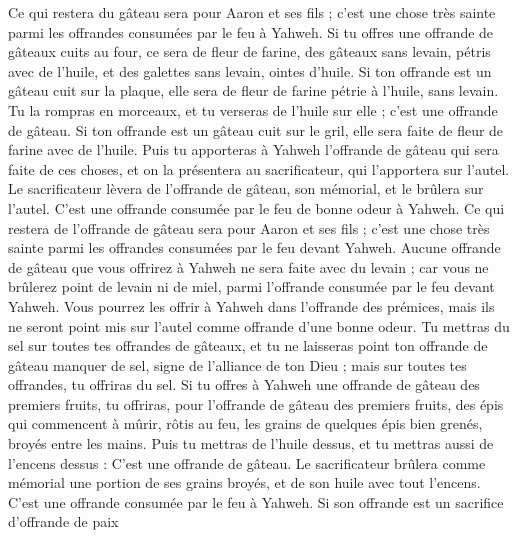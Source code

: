 \begin{multicols}{2}
Ce qui restera du gâteau sera pour Aaron et ses fils ; c'est une chose très sainte parmi les offrandes consumées par le feu à Yahweh.
Si tu offres une offrande de gâteaux cuits au four, ce sera de fleur de farine, des gâteaux sans levain, pétris avec de l'huile, et des galettes sans levain, ointes d'huile.
Si ton offrande est un gâteau cuit sur la plaque, elle sera de fleur de farine pétrie à l'huile, sans levain.
Tu la rompras en morceaux, et tu verseras de l'huile sur elle ; c'est une offrande de gâteau.
Si ton offrande est un gâteau cuit sur le gril, elle sera faite de fleur de farine avec de l'huile.
Puis tu apporteras à Yahweh l’offrande de gâteau qui sera faite de ces choses, et on la présentera au sacrificateur, qui l'apportera sur l'autel.
Le sacrificateur lèvera de l’offrande de gâteau, son mémorial, et le brûlera sur l'autel. C'est une offrande consumée par le feu de bonne odeur à Yahweh.
Ce qui restera de l’offrande de gâteau sera pour Aaron et ses fils ; c'est une chose très sainte parmi les offrandes consumées par le feu devant Yahweh.
Aucune offrande de gâteau que vous offrirez à Yahweh  ne sera faite avec du levain ; car vous ne brûlerez point de levain ni de miel, parmi l’offrande consumée par le feu devant Yahweh.
Vous pourrez les offrir à Yahweh dans l'offrande des prémices, mais ils ne seront point mis sur l'autel comme offrande d'une bonne odeur.
Tu mettras du sel sur toutes tes offrandes de gâteaux, et tu ne laisseras point ton offrande de gâteau manquer de sel, signe de l'alliance de ton Dieu ; mais sur toutes tes offrandes, tu offriras du sel.
Si tu offres à Yahweh une offrande de gâteau des premiers fruits, tu offriras, pour l’offrande de gâteau des premiers fruits, des épis qui commencent à mûrir, rôtis au feu, les grains de quelques épis bien grenés, broyés entre les mains.
Puis tu mettras de l'huile dessus, et tu mettras aussi de l'encens dessus : C'est une offrande de gâteau.
Le sacrificateur brûlera comme mémorial une portion de ses grains broyés, et de son huile avec tout l'encens. C'est une offrande consumée par le feu à Yahweh.
\VerseOne{}Si son offrande est un sacrifice d’offrande de paix
\end{multicols}
